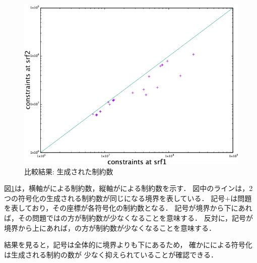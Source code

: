 \begin{figure}[htbp]
 \centering
 \includegraphics[scale=0.5]{fig/constraints.png}
 \caption{比較結果: 生成された制約数}
 \label{fig:constraints}
\end{figure}

図\ref{fig:constraints}は，横軸がによる制約数，縦軸がによる制約数を示す．
図中のラインは，2つの符号化の生成される制約数が同じになる境界を表している．
記号$+$は問題を表しており，その座標が各符号化の制約数となる．
記号が境界から下にあれば，その問題ではの方が制約数が少なくなることを意味する．
反対に，記号が境界から上にあれば，の方が制約数が少なくなることを意味する．

結果を見ると，記号は全体的に境界よりも下にあるため，
確かにによる符号化は生成される制約の数が
少なく抑えられていることが確認できる．


